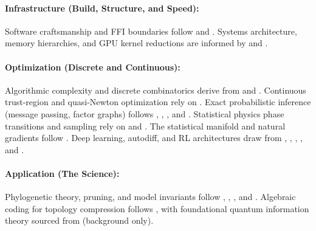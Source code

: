 \documentclass[11pt,a4paper]{article}
\begin{document}
\paragraph{Infrastructure (Build, Structure, and Speed):}
Software craftsmanship and FFI boundaries follow \citet{martin2008} and \citet{blandy2021}. Systems architecture, memory hierarchies, and GPU kernel reductions are informed by \citet{bryant2015} and \citet{pmpp2022}.

\paragraph{Optimization (Discrete and Continuous):}
Algorithmic complexity and discrete combinatorics derive from \citet{clrs2022} and \citet{rosen2019}. Continuous trust-region and quasi-Newton optimization rely on \citet{nocedal2006}. Exact probabilistic inference (message passing, factor graphs) follows \citet{mackay2003}, \citet{koller2009}, \citet{frey1998}, and \citet{ortega2022}. Statistical physics phase transitions and sampling rely on \citet{mezard2009} and \citet{newman1999}. The statistical manifold and natural gradients follow \citet{amari2016}. Deep learning, autodiff, and RL architectures draw from \citet{goodfellow2016}, \citet{prince2023}, \citet{suttonbarto2018}, \citet{lapan2020}, and \citet{raschka2024}.

\paragraph{Application (The Science):}
Phylogenetic theory, pruning, and model invariants follow \citet{felsenstein2004}, \citet{durbin1998}, \citet{compeau2015}, and \citet{pachter2005}. Algebraic coding for topology compression follows \citet{blahut2003}, with foundational quantum information theory sourced from \citet{nielsen2010} (background only).
\end{document}
